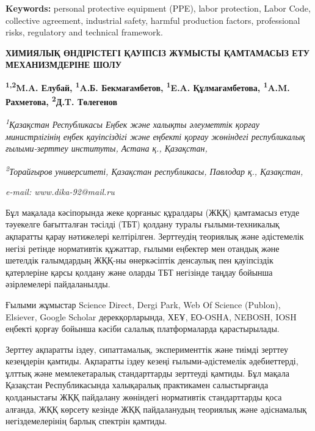 {\bfseries Keywords:} personal protective equipment (PPE), labor
protection, Labor Code, collective agreement, industrial safety, harmful
production factors, professional risks, regulatory and technical
framework.

\begin{articleheader}
{\bfseries ХИМИЯЛЫҚ ӨНДІРІСТЕГІ ҚАУІПСІЗ ЖҰМЫСТЫ ҚАМТАМАСЫЗ ЕТУ МЕХАНИЗМДЕРІНЕ ШОЛУ}

{\bfseries
\textsuperscript{1,2}M.A. Елубай,
\textsuperscript{1}A.Б. Бекмағамбетов,
\textsuperscript{1}E.A. Құлмағамбетова,
\textsuperscript{1}A.M. Рахметова,
\textsuperscript{2}Д.T. Төлегенов\textsuperscript{\envelope }}
\end{articleheader}

\begin{affiliation}
\emph{\textsuperscript{1}Қазақстан Республикасы Еңбек және халықты әлеуметтік қорғау министрлігінің еңбек қауіпсіздігі
және еңбекті қорғау жөніндегі республикалық ғылыми-зерттеу институты, Астана қ., Қазақстан,}

\emph{\textsuperscript{2}Торайғыров университеті, Қазақстан республикасы, Павлодар қ., Қазақстан,}

\emph{e-mail: www.dika-92@mail.ru}
\end{affiliation}

Бұл мақалада кәсіпорында жеке қорғаныс құралдары (ЖҚҚ) қамтамасыз етуде
тәуекелге бағытталған тәсілді (ТБТ) қолдану туралы ғылыми-техникалық
ақпаратты қарау нәтижелері келтірілген. Зерттеудің теориялық және
әдістемелік негізі ретінде нормативтік құжаттар, ғылыми еңбектер мен
отандық және шетелдік ғалымдардың ЖҚҚ-ны өнеркәсіптік денсаулық пен
қауіпсіздік қатерлеріне қарсы қолдану және оларды ТБТ негізінде таңдау
бойынша әзірлемелері пайдаланылды.

Ғылыми жұмыстар Science Direct, Dergi Park, Web Of Science (Publon),
Elsiever, Google Scholar дерекқорларында, ХЕҰ, ЕО-OSHA, NEBOSH, IOSH
еңбекті қорғау бойынша кәсіби салалық платформаларда қарастырылады.

Зерттеу ақпаратты іздеу, сипаттамалық, эксперименттік және тиімді
зерттеу кезеңдерін қамтиды. Ақпаратты іздеу кезеңі ғылыми-әдістемелік
әдебиеттерді, ұлттық және мемлекетаралық стандарттарды зерттеуді
қамтиды. Бұл мақала Қазақстан Республикасында халықаралық практикамен
салыстырғанда қолданыстағы ЖҚҚ пайдалану жөніндегі нормативтік
стандарттарды қоса алғанда, ЖҚҚ көрсету кезінде ЖҚҚ пайдаланудың
теориялық және әдіснамалық негіздемелерінің барлық спектрін қамтиды.

